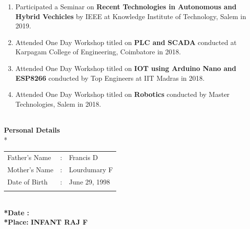\documentclass{article}
\begin{document}
\begin{flushleft}
\begin{itemize}
\begin{enumerate}
				\item Participated a Seminar on \textbf{Recent Technologies in Autonomous and Hybrid Vechicles} by IEEE at Knowledge Institute of Technology, Salem in 2019.
				\item Attended One Day Workshop titled on \textbf{PLC and SCADA} conducted at Karpagam College of Engineering, Coimbatore in 2018.
				\item Attended One Day Workshop titled on \textbf{IOT using Arduino Nano and ESP8266} conducted by Top Engineers at IIT Madras in 2018.
				\item Attended One Day Workshop titled on \textbf{Robotics} conducted by Master Technologies, Salem in 2018.
			\end{enumerate}
		\end{itemize}	
		\large \textbf{\\Personal Details}
		\\*
				\begin{tabular}{l l l }
				\large Father's Name & \large : & \large Francis D\\ \large Mother's Name & \large : & \large Lourdumary F\\
				\large Date of Birth & \large : & \large June 29, 1998\\ \\
\end{tabular}

		\large \textbf{\\*Date : }
		\large \textbf{\\*Place:  }	\hspace{360pt}\textbf{INFANT RAJ F}
	\end{flushleft}
\end{document}
